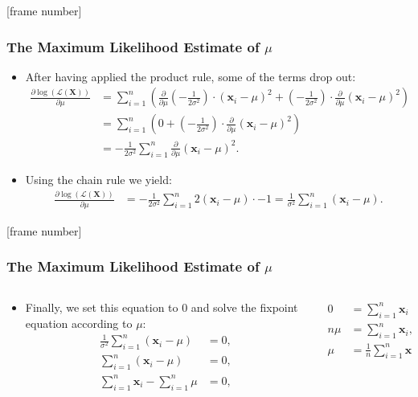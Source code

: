 \documentclass[aspectratio=169,t,xcolor=dvipsnames]{beamer}
\begin{document}
{
[frame number]
\begin{frame}
	\frametitle{The Maximum Likelihood Estimate of $\mu$}
	\begin{itemize}
		\item After having applied the product rule, some of the terms drop out:
    \begin{align}
      \frac{\partial \log\left(\mathcal{L}(\mathbf{X})\right)}{\partial \mu} &= \sum_{i=1}^{n} \left(\frac{\partial}{\partial\mu}\left(-\frac{1}{2\sigma^2}\right) \cdot (\mathbf{x}_i - \mu)^2 + \left( - \frac{1}{2\sigma^2} \right) \cdot \frac{\partial}{\partial\mu} (\mathbf{x}_i-\mu)^2\right) \\
      &= \sum_{i=1}^{n} \left(0 + \left( - \frac{1}{2\sigma^2} \right) \cdot \frac{\partial}{\partial\mu} (\mathbf{x}_i-\mu)^2\right)\\
      &= - \frac{1}{2\sigma^2} \sum_{i=1}^{n} \frac{\partial}{\partial\mu} (\mathbf{x}_i-\mu)^2.
    \end{align}
    \item Using the chain rule we yield:
    \begin{align}
        \frac{\partial \log\left(\mathcal{L}(\mathbf{X})\right)}{\partial \mu} &= - \frac{1}{2\sigma^2} \sum_{i=1}^{n}  2(\mathbf{x}_i-\mu) \cdot -1 = \frac{1}{\sigma^2} \sum_{i=1}^{n}  (\mathbf{x}_i-\mu).
    \end{align}
	\end{itemize}
\end{frame}
}

{
[frame number]
\begin{frame}
	\frametitle{The Maximum Likelihood Estimate of $\mu$}
  \begin{columns}
    \begin{column}{0.5\textwidth}
    	\begin{itemize}
    		\item Finally, we set this equation to $0$ and solve the fixpoint equation according to $\mu$:
        \begin{align}
          \frac{1}{\sigma^2} \sum_{i=1}^{n} (\mathbf{x}_i-\mu) &= 0, \\
          \sum_{i=1}^{n} (\mathbf{x}_i-\mu) &= 0, \\
          \sum_{i=1}^{n} \mathbf{x}_i- \sum_{i=1}^{n} \mu &= 0,
        \end{align}
    	\end{itemize}
    \end{column}
    \begin{column}{0.5\textwidth}
      \centering
      \begin{align}
        0 &= \sum_{i=1}^{n} \mathbf{x}_i- n \mu , \\
        n \mu &= \sum_{i=1}^{n} \mathbf{x}_i,\\
        \mu &= \frac{1}{n} \sum_{i=1}^{n}\mathbf{x}_i.
      \end{align}
    \end{column}
  \end{columns}
\end{frame}
}
\end{document}
